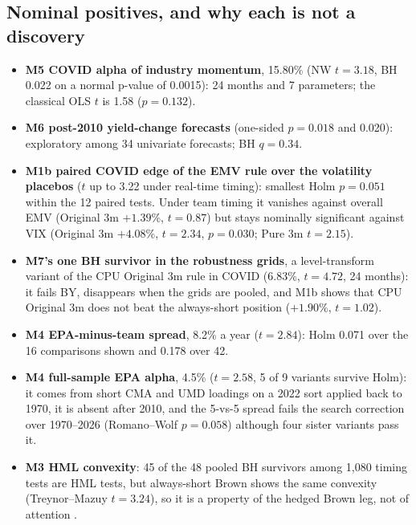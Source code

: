 \begin{table}[H]
\caption{Final verdict by candidate. No candidate reaches ``implement''; the optimizer book moves to paper-trading, and the report's verdict stays ``Do not implement''.}
\label{tab:m7verdict}
\centering\footnotesize

\end{table}

\subsection{Nominal positives, and why each is not a discovery}
\begin{itemize}
\item \textbf{M5 COVID alpha of industry momentum}, 15.80\% (NW $t=3.18$, BH 0.022 on a normal p-value of 0.0015): 24 months and 7 parameters; the classical OLS $t$ is 1.58 ($p=0.132$).
\item \textbf{M6 post-2010 yield-change forecasts} (one-sided $p=0.018$ and 0.020): exploratory among 34 univariate forecasts; BH $q=0.34$.
\item \textbf{M1b paired COVID edge of the EMV rule over the volatility placebos} ($t$ up to 3.22 under real-time timing): smallest Holm $p=0.051$ within the 12 paired tests. Under team timing it vanishes against overall EMV (Original 3m $+1.39$\%, $t=0.87$) but stays nominally significant against VIX (Original 3m $+4.08$\%, $t=2.34$, $p=0.030$; Pure 3m $t=2.15$).
\item \textbf{M7's one BH survivor in the robustness grids}, a level-transform variant of the CPU Original 3m rule in COVID (6.83\%, $t=4.72$, 24 months): it fails BY, disappears when the grids are pooled, and M1b shows that CPU Original 3m does not beat the always-short position ($+1.90$\%, $t=1.02$).
\item \textbf{M4 EPA-minus-team spread}, 8.2\% a year ($t=2.84$): Holm 0.071 over the 16 comparisons shown and 0.178 over 42.
\item \textbf{M4 full-sample EPA alpha}, 4.5\% ($t=2.58$, 5 of 9 variants survive Holm): it comes from short CMA and UMD loadings on a 2022 sort applied back to 1970, it is absent after 2010, and the 5-vs-5 spread fails the search correction over 1970--2026 (Romano--Wolf $p=0.058$) although four sister variants pass it.
\item \textbf{M3 HML convexity}: 45 of the 48 pooled BH survivors among 1,080 timing tests are HML tests, but always-short Brown shows the same convexity (Treynor--Mazuy $t=3.24$), so it is a property of the hedged Brown leg, not of attention \citep{tm1966,hm1981}.
\end{itemize}


